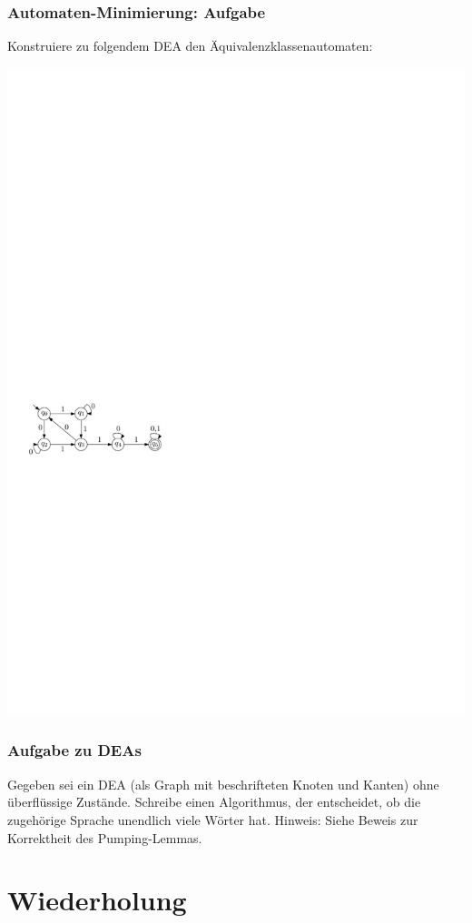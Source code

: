 \begin{frame}
 \frametitle{Automaten-Minimierung: Aufgabe}
Konstruiere zu folgendem DEA den Äquivalenzklassenautomaten:

 \begin{center}
   \includegraphics[scale=1.5]{images/Minimierung}
 \end{center}
\end{frame}
\begin{frame}
\frametitle{Aufgabe zu DEAs}
Gegeben sei ein DEA (als Graph mit beschrifteten Knoten und Kanten) ohne überflüssige Zustände.
Schreibe einen Algorithmus, der entscheidet, ob die zugehörige Sprache unendlich viele Wörter hat. Hinweis: Siehe Beweis zur Korrektheit des Pumping-Lemmas.
\end{frame}

\section{Wiederholung}

